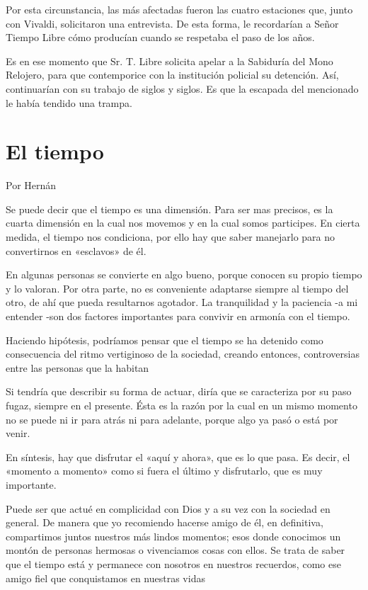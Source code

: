 \documentclass[11pt,twoside,openright,a5paper]{book}
\begin{document}
Por esta circunstancia, las más afectadas fueron las cuatro estaciones que, junto con Vivaldi, solicitaron una entrevista. De esta forma, le recordarían a Señor Tiempo Libre cómo producían cuando se respetaba el paso de los años.

Es en ese momento que Sr. T. Libre solicita apelar a la Sabiduría del Mono Relojero, para que contemporice con la institución policial su detención. Así, continuarían con su trabajo de siglos y siglos. Es que la escapada del mencionado le había tendido una trampa.
\clearpage
\section*{El tiempo}
                                                                                                \begin{flushright}Por Hernán\end{flushright}

Se puede decir que el tiempo es una dimensión. Para ser mas precisos, es la cuarta dimensión  en la cual nos movemos y en la cual somos participes. En cierta medida, el tiempo nos condiciona, por ello hay que saber manejarlo para no convertirnos en «esclavos» de él.  

En algunas personas se convierte en algo bueno, porque conocen su propio tiempo y lo valoran. Por otra parte, no es conveniente adaptarse siempre  al tiempo del otro, de ahí que pueda resultarnos agotador. La tranquilidad y la paciencia -a mi entender -son dos factores importantes para convivir en armonía con el tiempo.

Haciendo hipótesis, podríamos pensar que el tiempo se ha detenido como consecuencia del ritmo vertiginoso de la sociedad, creando entonces, controversias entre las personas que la habitan

Si tendría que describir su forma de actuar, diría que se caracteriza por su paso fugaz, siempre  en el presente. Ésta es la razón por la cual en un mismo momento no se puede ni ir para atrás ni para adelante, porque algo ya pasó o está por venir. 

En síntesis, hay que disfrutar el «aquí y ahora», que es lo que pasa. Es decir, el «momento a momento» como si fuera el último y disfrutarlo, que es muy importante.

Puede ser que actué en complicidad con Dios y a su vez con la sociedad en general. De manera que yo recomiendo hacerse amigo de él, en definitiva, compartimos juntos nuestros más lindos momentos; esos donde conocimos un montón de personas hermosas o vivenciamos cosas con ellos. Se trata de saber que el tiempo está y permanece con nosotros en nuestros recuerdos, como ese amigo fiel que conquistamos en nuestras vidas
\end{document}
